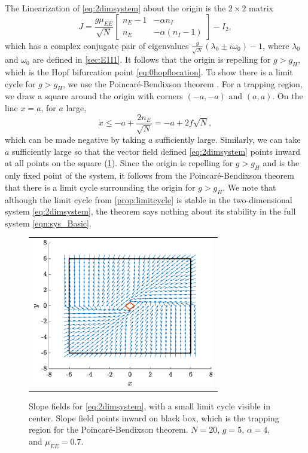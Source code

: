 \documentclass[reqno]{siamonline190516}
\begin{document}
The Linearization of \cref{eq:2dimsystem} about the origin is the $2 \times 2$ matrix
\[
J = \frac{g \mu_{EE}}{\sqrt{N}}
\begin{bmatrix} 
n_E - 1 & -\alpha n_I \\
n_E & -\alpha(n_I - 1)
\end{bmatrix} - I_2,
\]
which has a complex conjugate pair of eigenvalues $\frac{g}{\sqrt{N}}(\lambda_0 \pm i \omega_0) - 1$, where $\lambda_0$ and $\omega_0$ are defined in \cref{sec:E1I1}. It follows that the origin is repelling for $g > g_H$, which is the Hopf bifurcation point \cref{eq:0hopflocation}. To show there is a limit cycle for $g > g_H$, we use the Poincar{\'e}-Bendixson theorem \cite[Chapter 16]{Coddington1955}. For a trapping region, we draw a square around the origin with corners $(-a, -a)$ and $(a, a)$. On the line $x = a$, for $a$ large,
\[
\dot{x} \leq -a + \frac{2 n_E}{\sqrt{N}} = -a + 2 f \sqrt{N},
\]
which can be made negative by taking $a$ sufficiently large. Similarly, we can take $a$ sufficiently large so that the vector field defined \cref{eq:2dimsystem} points inward at all points on the square (\cref{fig:nullclines}). Since the origin is repelling for $g > g_H$ and is the only fixed point of the system, it follows from the Poincar{\'e}-Bendixson theorem that there is a limit cycle surrounding the origin for $g > g_H$. We note that although the limit cycle from \cref{prop:limitcycle} is stable in the two-dimensional system \cref{eq:2dimsystem}, the theorem says nothing about its stability in the full system \cref{eqn:sys_Basic}.
\begin{figure}
    \centering
    \begin{tabular}{c}
    \includegraphics[width=8cm]{images/trappingregion.eps}
    \end{tabular}
    \caption{Slope fields for \cref{eq:2dimsystem}, with a small limit cycle visible in center. Slope field points inward on black box, which is the trapping region for the Poincar{\'e}-Bendixson theorem. $N = 20$, $g = 5$, $\alpha = 4$, and $\mu_{EE} = 0.7$.}
    \label{fig:nullclines}
\end{figure}
\end{document}
